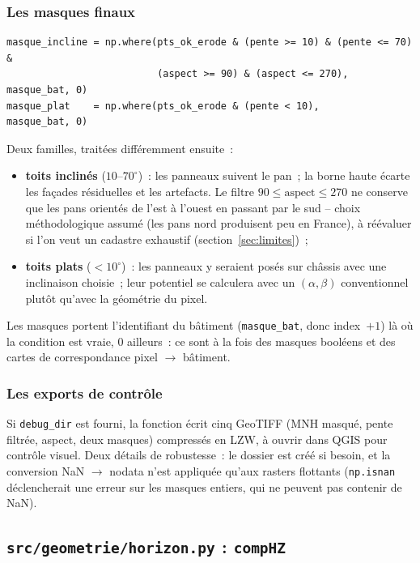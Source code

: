 \documentclass[11pt,a4paper]{article}
\newcommand{\fichier}[1]{\texttt{#1}}
\newcommand{\fonction}[1]{\texttt{#1}}
\begin{document}
\subsubsection{Les masques finaux}

\begin{lstlisting}
masque_incline = np.where(pts_ok_erode & (pente >= 10) & (pente <= 70) &
                          (aspect >= 90) & (aspect <= 270), masque_bat, 0)
masque_plat    = np.where(pts_ok_erode & (pente < 10),      masque_bat, 0)
\end{lstlisting}

Deux familles, traitées différemment ensuite~:
\begin{itemize}
  \item \textbf{toits inclinés} ($10$--$70^\circ$)~: les panneaux suivent le
    pan~; la borne haute écarte les façades résiduelles et les artefacts. Le
    filtre $90 \leq \text{aspect} \leq 270$ ne conserve que les pans orientés
    de l'est à l'ouest en passant par le sud -- choix méthodologique assumé
    (les pans nord produisent peu en France), à réévaluer si l'on veut un
    cadastre exhaustif (section~\ref{sec:limites})~;
  \item \textbf{toits plats} ($< 10^\circ$)~: les panneaux y seraient posés sur
    châssis avec une inclinaison choisie~; leur potentiel se calculera avec un
    $(\alpha, \beta)$ conventionnel plutôt qu'avec la géométrie du pixel.
\end{itemize}
Les masques portent l'identifiant du bâtiment (\fonction{masque\_bat}, donc
index~$+1$) là où la condition est vraie, 0 ailleurs~: ce sont à la fois des
masques booléens et des cartes de correspondance pixel $\rightarrow$ bâtiment.

\subsubsection{Les exports de contrôle}

Si \fonction{debug\_dir} est fourni, la fonction écrit cinq GeoTIFF (MNH masqué,
pente filtrée, aspect, deux masques) compressés en LZW, à ouvrir dans QGIS pour
contrôle visuel. Deux détails de robustesse~: le dossier est créé si besoin, et
la conversion NaN $\rightarrow$ nodata n'est appliquée qu'aux rasters flottants
(\fonction{np.isnan} déclencherait une erreur sur les masques entiers, qui ne
peuvent pas contenir de NaN).

\subsection{\fichier{src/geometrie/horizon.py} : \fonction{compHZ}}
\label{sec:horizon}
\end{document}
